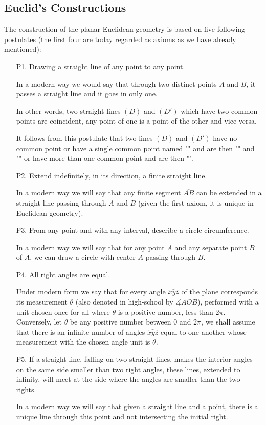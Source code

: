 	\subsection{Euclid's Constructions}\label{euclid's postulates}
	The construction of the planar Euclidean geometry is based on five following postulates (the first four are today regarded as axioms as we have already mentioned):
	\begin{enumerate}
		\item[P1.] Drawing a straight line of any point to any point.
		
		In a modern way we would say that through two distinct points $A$ and $B$, it passes a straight line and it goes in only one.
		
		In other words, two straight lines $(D)$ and $(D ')$ which have two common points are coincident, any point of one is a point of the other and vice versa.
		
		It follows from this postulate that two lines $(D)$ and $(D ')$ have no common point or have a single common point named "" and are then "" and "" or have more than one common point and are then "".
		
		\item[P2.] Extend indefinitely, in its direction, a finite straight line.
		
		In a modern way we will say that any finite segment $\overline{AB}$ can be extended in a straight line passing through $A$ and $B$ (given the first axiom, it is unique in Euclidean geometry).
		
		\item[P3.] From any point and with any interval, describe a circle circumference.
		
		In a modern way we will say that for any point $A$ and any separate point $B$ of $A$, we can draw a circle with center $A$ passing through $B$.
		
		\item[P4.] All right angles are equal.
		
		Under modern form we say that for every angle $\widehat{xyz}$ of the plane corresponds its  measurement $\theta$ (also denoted in high-school by $\measuredangle AOB$), performed with a unit chosen once for all where $\theta$ is a positive number, less than $2\pi$. Conversely, let $\theta$ be any positive number between $0$ and $2\pi$, we shall assume that there is an infinite number of angles $\widehat{xyz}$ equal to one another whose measurement with the chosen angle unit is $\theta$.
		
		 \item[P5.] If a straight line, falling on two straight lines, makes the interior angles on the same side smaller than two right angles, these lines, extended to infinity, will meet at the side where the angles are smaller than the two rights.
		 
		 In a modern way we will say that given a straight line and a point, there is a unique line through this point and not intersecting the initial right.		
	\end{enumerate}

